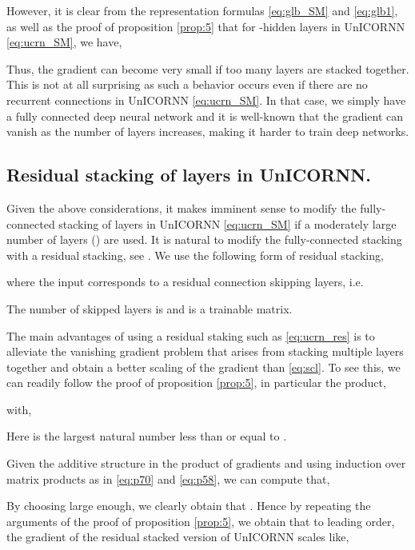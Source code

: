 \documentclass{article}
\begin{document}
However, it is clear from the representation formulas \eqref{eq:glb_SM} and \eqref{eq:glb1}, as well as the proof of proposition \ref{prop:5} that for -hidden layers in UnICORNN \eqref{eq:ucrn_SM}, we have,

Thus, the gradient can become very small if too many layers are stacked together. This is not at all surprising as such a behavior occurs even if there are no recurrent connections in UnICORNN \eqref{eq:ucrn_SM}. In that case, we simply have a fully connected deep neural network and it is well-known that the gradient can vanish as the number of layers increases, making it harder to train deep networks. 
\subsection{Residual stacking of layers in UnICORNN.}
\label{resnet_grad}
Given the above considerations, it makes imminent sense to modify the fully-connected stacking of layers in UnICORNN \eqref{eq:ucrn_SM} if a moderately large number of layers () are used. It is natural to modify the fully-connected stacking with a residual stacking, see \cite{deep_indrnn}. We use the following form of residual stacking,

where the input  corresponds to a residual connection skipping  layers, i.e.

The number of skipped layers is  and  is a trainable matrix. 

The main advantages of using a residual staking such as \eqref{eq:ucrn_res} is to alleviate the vanishing gradient problem that arises from stacking multiple layers together and obtain a better scaling of the gradient than \eqref{eq:scl}. To see this, we can readily follow the proof of proposition \ref{prop:5}, in particular the product,

with,

Here  is the largest natural number less than or equal to .

Given the additive structure in the product of gradients and using induction over matrix products as in \eqref{eq:p70} and \eqref{eq:p58}, we can compute that,

    
By choosing  large enough, we clearly obtain that . Hence by repeating the arguments of the proof of proposition \ref{prop:5}, we obtain that to leading order, the gradient of the residual stacked version of UnICORNN scales like,
\end{document}
